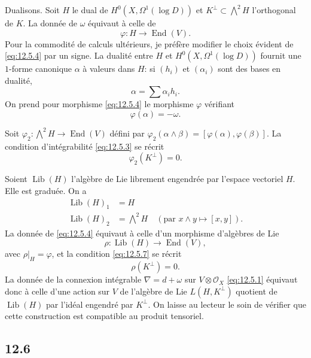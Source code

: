 \documentclass[12pt,a4paper]{article}
\theoremstyle{plain}
\theoremstyle{definition}
\theoremstyle{remark}
\DeclareMathOperator{\Lib}{Lib}
\DeclareMathOperator{\End}{End}
\newcommand{\cO}{\mathcal{O}}
\begin{document}
Dualisons. Soit $H$ le dual de $H^0(X, \Omega^1(\log D))$ et $K^\perp \subset \bigwedge^2 H$ l'orthogonal de $K$. La donnée de $\omega$ équivaut à celle de
\begin{equation}\label{eq:12.5.4}
\varphi : H \to \End(V).
\end{equation}
Pour la commodité de calculs ultérieurs, je préfère modifier le choix évident de \eqref{eq:12.5.4} par un signe. La dualité entre $H$ et $H^0(X, \Omega^1(\log D))$ fournit une $1$-forme canonique $\alpha$ à valeurs dans $H$: si $(h_i)$ et $(\alpha_i)$ sont des bases en dualité,
\begin{equation}\label{eq:12.5.5}
\alpha = \sum \alpha_i h_i.
\end{equation}
On prend pour morphisme \eqref{eq:12.5.4} le morphisme $\varphi$ vérifiant
\begin{equation}\label{eq:12.5.6}
\varphi(\alpha) = -\omega.
\end{equation}

Soit $\varphi_2 : \bigwedge^2 H \to \End(V)$ défini par $\varphi_2(\alpha \wedge \beta) = [\varphi(\alpha), \varphi(\beta)]$. La condition d'intégrabilité \eqref{eq:12.5.3} se récrit
\begin{equation}\label{eq:12.5.7}
\varphi_2(K^\perp) = 0.
\end{equation}

Soient $\Lib(H)$ l'algèbre de Lie librement engendrée par l'espace vectoriel $H$. Elle est graduée. On a
\begin{align*}
\Lib(H)_1 &= H \\
\Lib(H)_2 &= \textstyle\bigwedge^2 H \quad (\text{par } x \wedge y \mapsto [x,y]).
\end{align*}
La donnée de \eqref{eq:12.5.4} équivaut à celle d'un morphisme d'algèbres de Lie
\begin{equation}\label{eq:12.5.8}
\rho : \Lib(H) \to \End(V),
\end{equation}
avec $\rho|_H = \varphi$, et la condition \eqref{eq:12.5.7} se récrit
\begin{equation}\label{eq:12.5.9}
\rho(K^\perp) = 0.
\end{equation}
La donnée de la connexion intégrable $\nabla = d + \omega$ sur $V \otimes \cO_X$ \eqref{eq:12.5.1} équivaut donc à celle d'une action sur $V$ de l'algèbre de Lie $L(H, K^\perp)$ quotient de $\Lib(H)$ par l'idéal engendré par $K^\perp$. On laisse au lecteur le soin de vérifier que cette construction est compatible au produit tensoriel.

\subsection*{12.6}
\end{document}
